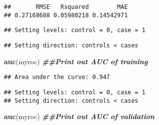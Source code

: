 \documentclass[
]{article}
\newenvironment{Shaded}{\begin{snugshade}}{\end{snugshade}}
\newcommand{\CommentTok}[1]{\textcolor[rgb]{0.56,0.35,0.01}{\textit{#1}}}
\newcommand{\DocumentationTok}[1]{\textcolor[rgb]{0.56,0.35,0.01}{\textbf{\textit{#1}}}}
\newcommand{\FunctionTok}[1]{\textcolor[rgb]{0.13,0.29,0.53}{\textbf{#1}}}
\newcommand{\NormalTok}[1]{#1}
\newcommand{\OtherTok}[1]{\textcolor[rgb]{0.56,0.35,0.01}{#1}}
\newcommand{\SpecialCharTok}[1]{\textcolor[rgb]{0.81,0.36,0.00}{\textbf{#1}}}
\begin{document}
\begin{verbatim}
##       RMSE   Rsquared        MAE 
## 0.27168688 0.05980218 0.14542971
\end{verbatim}

\begin{Shaded}
\end{Shaded}

\begin{verbatim}
## Setting levels: control = 0, case = 1
\end{verbatim}

\begin{verbatim}
## Setting direction: controls < cases
\end{verbatim}

\begin{Shaded}
\begin{Highlighting}[]
\FunctionTok{auc}\NormalTok{(myroc) }\DocumentationTok{\#\#Print out AUC of training}
\end{Highlighting}
\end{Shaded}

\begin{verbatim}
## Area under the curve: 0.947
\end{verbatim}

\begin{Shaded}
\end{Shaded}

\begin{verbatim}
## Setting levels: control = 0, case = 1
## Setting direction: controls < cases
\end{verbatim}

\begin{Shaded}
\begin{Highlighting}[]
\FunctionTok{auc}\NormalTok{(myroc) }\DocumentationTok{\#\#Print out AUC of validation}
\end{Highlighting}
\end{Shaded}
\end{document}
